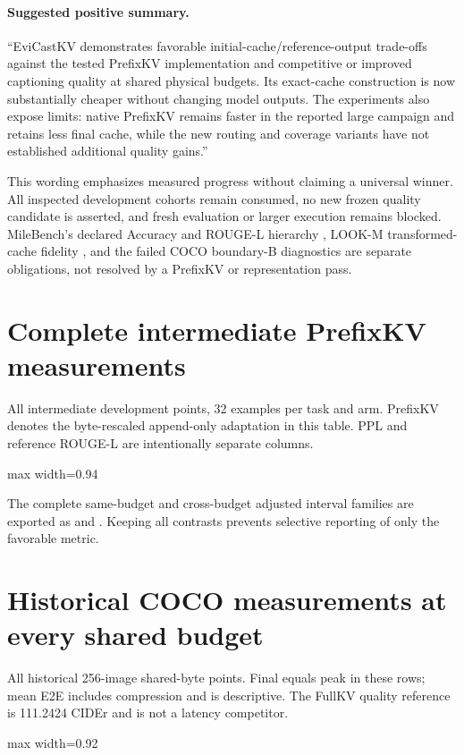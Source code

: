 \documentclass[10pt,letterpaper]{article}
\newcommand{\Evi}{EviCastKV}
\newcommand{\resulttable}[2]{\begin{center}\small\begin{adjustbox}{max width=#1}\end{adjustbox}\end{center}}
\begin{document}
\paragraph{Suggested positive summary.}
``\Evi{} demonstrates favorable initial-cache/reference-output trade-offs
against the tested PrefixKV implementation and competitive or improved
captioning quality at shared physical budgets. Its exact-cache construction
is now substantially cheaper without changing model outputs. The
experiments also expose limits: native PrefixKV remains faster in the
reported large campaign and retains less final cache, while the new
routing and coverage variants have not established additional quality gains.''

This wording emphasizes measured progress without claiming a universal
winner. All inspected development cohorts remain consumed, no new frozen
quality candidate is asserted, and fresh evaluation or larger execution
remains blocked. MileBench's declared Accuracy and ROUGE-L hierarchy
\citep{song2024milebench}, LOOK-M transformed-cache fidelity
\citep{wan2024lookm}, and the failed COCO boundary-B diagnostics are separate
obligations, not resolved by a PrefixKV or representation pass.

\appendix
\clearpage
\section{Complete intermediate PrefixKV measurements}
\label{app:intermediate}
\begin{table}[htbp]
\caption{All intermediate development points, 32 examples per task and arm.
PrefixKV denotes the byte-rescaled append-only adaptation in this table.
PPL and reference ROUGE-L are intentionally separate columns.}
\resulttable{0.94\linewidth}{prefix_intermediate}
\end{table}
The complete same-budget and cross-budget adjusted interval families are
exported as  and
. Keeping all
contrasts prevents selective reporting of only the favorable metric.

\section{Historical COCO measurements at every shared budget}
\label{app:coco}
\begin{table}[htbp]
\caption{All historical 256-image shared-byte points. Final equals peak
in these rows; mean E2E includes compression and is descriptive. The
FullKV quality reference is 111.2424 CIDEr and is not a latency competitor.}
\resulttable{0.92\linewidth}{coco256}
\end{table}
\end{document}
